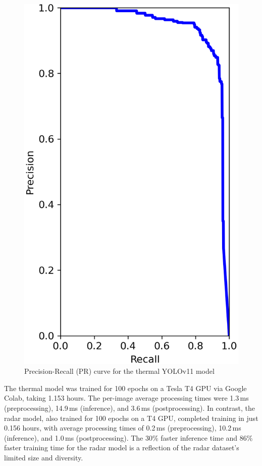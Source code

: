 \begin{figure} %
  \centering
  \includegraphics[width=\linewidth]{figs/Rory/APR_curve_therm.png} %
  \caption{Precision-Recall (PR) curve for the thermal YOLOv11 model}
  \label{fig:pr_curve}
\end{figure}

The thermal model was trained for 100 epochs on a Tesla T4 GPU via Google Colab, taking 1.153 hours. The per-image average processing times were 1.3\,ms (preprocessing), 14.9\,ms (inference), and 3.6\,ms (postprocessing). In contrast, the radar model, also trained for 100 epochs on a T4 GPU, completed training in just 0.156 hours, with average processing times of 0.2\,ms (preprocessing), 10.2\,ms (inference), and 1.0\,ms (postprocessing). The 30\% faster inference time and 86\% faster training time for the radar model is a reflection of the radar dataset's limited size and diversity.


